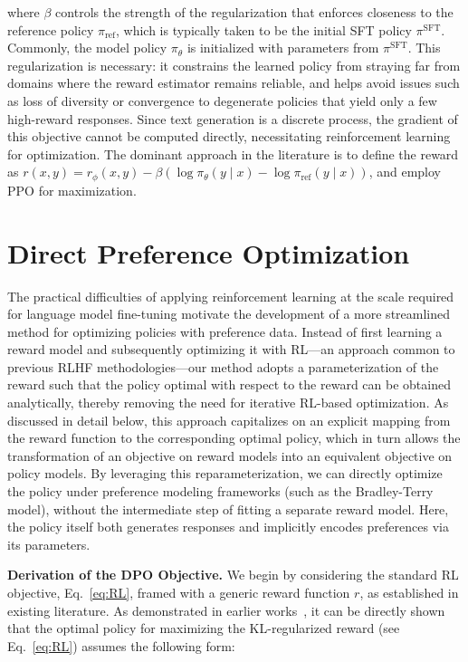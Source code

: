 where $\beta$ controls the strength of the regularization that enforces closeness to the reference policy $\pi_\text{ref}$, which is typically taken to be the initial SFT policy $\pi^\text{SFT}$. Commonly, the model policy $\pi_\theta$ is initialized with parameters from $\pi^\text{SFT}$. This regularization is necessary: it constrains the learned policy from straying far from domains where the reward estimator remains reliable, and helps avoid issues such as loss of diversity or convergence to degenerate policies that yield only a few high-reward responses. Since text generation is a discrete process, the gradient of this objective cannot be computed directly, necessitating reinforcement learning for optimization. The dominant approach in the literature \citep{ziegler2020finetuning, stiennon2022learning, bai2022training, ouyang2022training} is to define the reward as ${r(x, y) = r_{\phi}(x, y) -\beta (\log \pi_{\theta}(y\mid x) - \log \pi_\text{ref}(y\mid x))}$, and employ PPO \cite{schulman2017proximal} for maximization.

\section{Direct Preference Optimization}\label{sec:DPO}

The practical difficulties of applying reinforcement learning at the scale required for language model fine-tuning motivate the development of a more streamlined method for optimizing policies with preference data. Instead of first learning a reward model and subsequently optimizing it with RL—an approach common to previous RLHF methodologies—our method adopts a parameterization of the reward such that the policy optimal with respect to the reward can be obtained analytically, thereby removing the need for iterative RL-based optimization. As discussed in detail below, this approach capitalizes on an explicit mapping from the reward function to the corresponding optimal policy, which in turn allows the transformation of an objective on reward models into an equivalent objective on policy models. By leveraging this reparameterization, we can directly optimize the policy under preference modeling frameworks (such as the Bradley-Terry model), without the intermediate step of fitting a separate reward model. Here, the policy itself both generates responses and implicitly encodes preferences via its parameters.

\textbf{Derivation of the DPO Objective.} We begin by considering the standard RL objective, Eq.~\ref{eq:RL}, framed with a generic reward function $r$, as established in existing literature. As demonstrated in earlier works~\citep{peters2007reinforcement, peng2019advantage, korbak2022reinforcement, go2023aligning}, it can be directly shown that the optimal policy for maximizing the KL-regularized reward (see Eq.~\ref{eq:RL}) assumes the following form:

